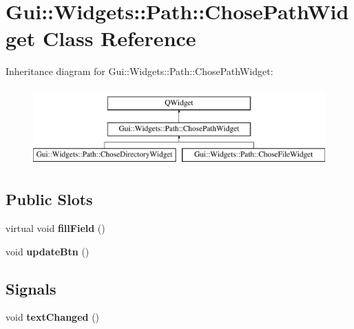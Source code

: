 \hypertarget{classGui_1_1Widgets_1_1Path_1_1ChosePathWidget}{\section{Gui\-:\-:Widgets\-:\-:Path\-:\-:Chose\-Path\-Widget Class Reference}
\label{classGui_1_1Widgets_1_1Path_1_1ChosePathWidget}
}
Inheritance diagram for Gui\-:\-:Widgets\-:\-:Path\-:\-:Chose\-Path\-Widget\-:\begin{figure}[H]
\begin{center}
\leavevmode
\includegraphics[height=3.000000cm]{db/de6/classGui_1_1Widgets_1_1Path_1_1ChosePathWidget}
\end{center}
\end{figure}
\subsection*{Public Slots}
\begin{DoxyCompactItemize}
\item 
\hypertarget{classGui_1_1Widgets_1_1Path_1_1ChosePathWidget_aea561fda3f9be03e9454f7af62683da7}{virtual void {\bfseries fill\-Field} ()}\label{classGui_1_1Widgets_1_1Path_1_1ChosePathWidget_aea561fda3f9be03e9454f7af62683da7}

\item 
\hypertarget{classGui_1_1Widgets_1_1Path_1_1ChosePathWidget_aabd7f232ed413f7308a0ce84641ab42e}{void {\bfseries update\-Btn} ()}\label{classGui_1_1Widgets_1_1Path_1_1ChosePathWidget_aabd7f232ed413f7308a0ce84641ab42e}

\end{DoxyCompactItemize}
\subsection*{Signals}
\begin{DoxyCompactItemize}
\item 
\hypertarget{classGui_1_1Widgets_1_1Path_1_1ChosePathWidget_aab68756973032c2130967efdcc5f2973}{void {\bfseries text\-Changed} ()}\label{classGui_1_1Widgets_1_1Path_1_1ChosePathWidget_aab68756973032c2130967efdcc5f2973}

\end{DoxyCompactItemize}

